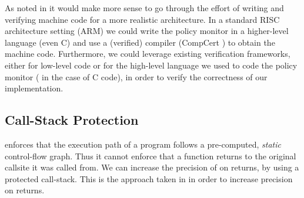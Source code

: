 As noted in \cite{popl2015} it would make more sense to go
through the effort of writing and verifying machine code for a more
realistic architecture.  In a standard RISC architecture setting
(\EG ARM) we could write the policy monitor in a higher-level
language (even C) and use a (verified) compiler (\EG CompCert
\cite{leroy09:compcert}) to obtain the machine code. Furthermore, we
could leverage existing verification frameworks, either for low-level
code \cite{Chlipala2013,JensenBK13} or for the high-level language we
used to code the policy monitor (\EG
\cite{Appel:2011:VST:1987211.1987212} in the case of C code), in order
to verify the correctness of our implementation.



\subsection{Call-Stack Protection}

\CFI enforces that the execution path of a program follows a
pre-computed, \textit{static} control-flow graph. Thus it cannot
enforce that a function returns to the original callsite it was called
from. We can increase the precision of \CFI on returns, by using a
protected call-stack. This is the approach taken in \cite{AbadiBEL09} in
order to increase precision on returns.

